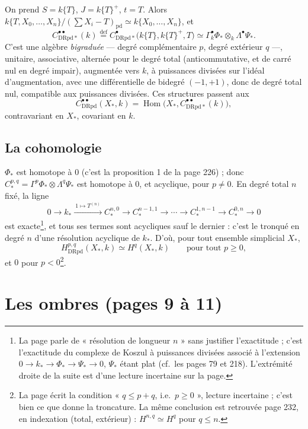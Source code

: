 \documentclass[11pt,a4paper]{article}
\begin{document}
On prend $S = k\{T\}$, $J = k\{T\}^+$, $t = T$. Alors
$k\{T, X_0, \ldots, X_n\}/(\sum X_i - T)_{\mathrm{pd}} \simeq k\{X_0, \ldots,
X_n\}$, et
\[
C^{\bullet\bullet}_{\mathrm{DRpd}*}(k) \overset{\mathrm{def}}{=} C^\bullet_{\mathrm{DRpd}*}\bigl(k\{T\}, k\{T\}^+, T\bigr) \simeq \Gamma^\bullet_k \Phi_* \otimes_k \Lambda^\bullet \Psi_* .
\]
C'est une algèbre \emph{bigraduée} — degré complémentaire $p$, degré
extérieur $q$ —, unitaire, associative, alternée pour le degré total
(anticommutative, et de carré nul en degré impair), augmentée vers $k$, à
puissances divisées sur l'idéal d'augmentation, avec une différentielle de
bidegré $(-1, +1)$, donc de degré total nul, compatible aux puissances
divisées. Ces structures passent aux
\[
C^{\bullet\bullet}_{\mathrm{DRpd}}(X_*, k) = \operatorname{Hom}\bigl(X_*, C^{\bullet\bullet}_{\mathrm{DRpd}*}(k)\bigr) ,
\]
contravariant en $X_*$, covariant en $k$.

\subsection*{La cohomologie}

$\Phi_*$ est homotope à $0$ (c'est la proposition 1 de la page 226) ; donc
$C^{p,q}_* = \Gamma^p \Phi_* \otimes \Lambda^q \Psi_*$ est homotope à $0$, et
acyclique, pour $p \neq 0$. En degré total $n$ fixé, la ligne
\[
0 \to k_* \xrightarrow{\ 1 \mapsto T^{(n)}\ } C^{n,0}_* \to C^{n-1,1}_* \to \cdots \to C^{1,n-1}_* \to C^{0,n}_* \to 0
\]
est exacte\footnote{La page parle de « résolution de longueur $n$ » sans
justifier l'exactitude ; c'est l'exactitude du complexe de Koszul à puissances
divisées associé à l'extension $0 \to k_* \to \Phi_* \to \Psi_* \to 0$, $\Psi_*$
étant plat (cf.\ les pages 79 et 218). L'extrémité droite de la suite est
d'une lecture incertaine sur la page.}, et tous ses termes sont acycliques sauf
le dernier : c'est le tronqué en degré $n$ d'une résolution acyclique de $k_*$.
D'où, pour tout ensemble simplicial $X_*$,
\[
H^{p,q}_{\mathrm{DRpd}}(X_*, k) \simeq H^q(X_*, k) \qquad \text{pour tout } p \geq 0 ,
\]
et $0$ pour $p < 0$\footnote{La page écrit la condition « $q \leq p+q$,
i.e.\ $p \geq 0$ », lecture incertaine ; c'est bien ce que donne la troncature.
La même conclusion est retrouvée page 232, en indexation (total, extérieur) :
$H^{n,q} \simeq H^q$ pour $q \leq n$.}.

\section*{Les ombres (pages 9 à 11)}
\end{document}
